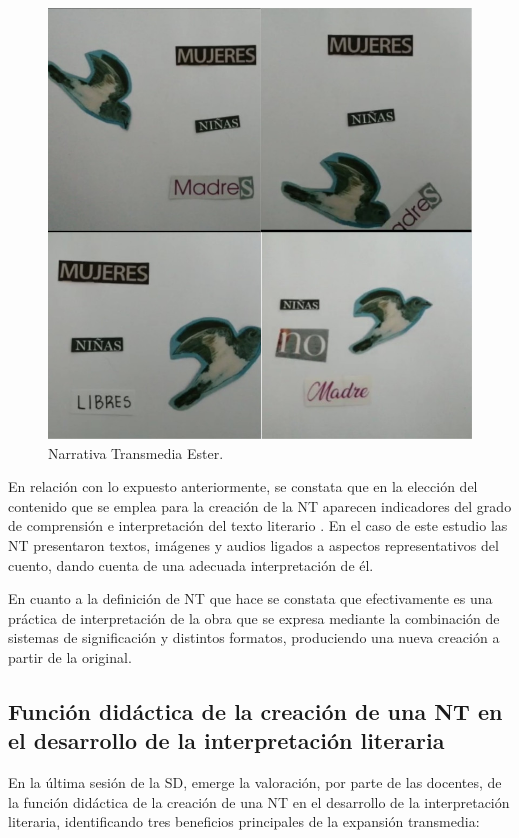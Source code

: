 \documentclass[spanish]{textolivre}
\begin{document}
\begin{figure}[htbp]
 \centering
 \begin{minipage}{.65\textwidth}
 \includegraphics[width=\textwidth]{Fig3.jpg}
 \caption{Narrativa Transmedia Ester.}
 \label{fig03}
 \end{minipage}
\end{figure}

En relación con lo expuesto anteriormente, se constata que en la elección del contenido que se emplea para la creación de la NT aparecen indicadores del grado de comprensión e interpretación del texto literario \cite{ramos_estrategias_2008}. En el caso de este estudio las NT presentaron textos, imágenes y audios ligados a aspectos representativos del cuento, dando cuenta de una adecuada interpretación de él.

En cuanto a la definición de NT que hace \textcite{scolari_narrativas_2013} se constata que efectivamente es una práctica de interpretación de la obra que se expresa mediante la combinación de sistemas de significación y distintos formatos, produciendo una nueva creación a partir de la original.

\subsection{Función didáctica de la creación de una NT en el desarrollo de la interpretación literaria}\label{sec-format-simple}
En la última sesión de la SD, emerge la valoración, por parte de las docentes, de la función didáctica de la creación de una NT en el desarrollo de la interpretación literaria, identificando tres beneficios principales de la expansión transmedia: 
\end{document}
